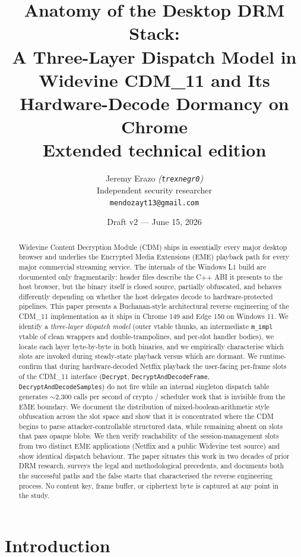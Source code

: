 \documentclass[11pt,letterpaper]{article}
\title{\textbf{Anatomy of the Desktop DRM Stack:\\
A Three-Layer Dispatch Model in Widevine CDM\_11
and Its Hardware-Decode Dormancy on Chrome \\
\large{Extended technical edition}}}
\author{
  Jeremy Erazo \textit{(\texttt{trexnegr0})} \\
  Independent security researcher \\
  \texttt{mendozayt13@gmail.com}
}
\date{Draft v2 --- June 15, 2026}
\begin{document}
\maketitle

\begin{abstract}
\noindent
Widevine Content Decryption Module (CDM) ships in essentially every
major desktop browser and underlies the Encrypted Media Extensions
(EME) playback path for every major commercial streaming service.
The internals of the Windows L1 build are documented only
fragmentarily: header files describe the C++ ABI it presents to the
host browser, but the binary itself is closed source, partially
obfuscated, and behaves differently depending on whether the host
delegates decode to hardware-protected pipelines.
This paper presents a Buchanan-style architectural reverse engineering
of the CDM\_11 implementation as it ships in Chrome 149 and Edge 150
on Windows 11. We identify a \emph{three-layer dispatch model} (outer
vtable thunks, an intermediate \texttt{m\_impl} vtable of clean
wrappers and double-trampolines, and per-slot handler bodies), we
locate each layer byte-by-byte in both binaries, and we empirically
characterise which slots are invoked during steady-state playback
versus which are dormant. We runtime-confirm that during
hardware-decoded Netflix playback the user-facing per-frame slots of
the CDM\_11 interface (\texttt{Decrypt},
\texttt{DecryptAndDecodeFrame}, \texttt{DecryptAndDecodeSamples}) do
not fire while an internal singleton dispatch table generates
$\sim$2{,}300 calls per second of crypto / scheduler work that is
invisible from the EME boundary. We document the distribution of
mixed-boolean-arithmetic style obfuscation across the slot space and
show that it is concentrated where the CDM begins to parse
attacker-controllable structured data, while remaining absent on slots
that pass opaque blobs. We then verify reachability of the
session-management slots from two distinct EME applications (Netflix
and a public Widevine test source) and show identical dispatch
behaviour. The paper situates this work in two decades of prior DRM
research, surveys the legal and methodological precedents, and
documents both the successful paths and the false starts that
characterised the reverse engineering process. No content key, frame
buffer, or ciphertext byte is captured at any point in the study.
\end{abstract}

\section{Introduction}
\label{sec:intro}
\end{document}
